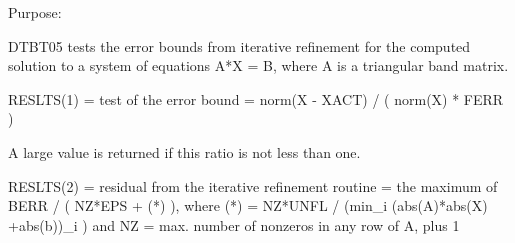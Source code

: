 \begin{DoxyParagraph}{Purpose\+: }
\begin{DoxyVerb} DTBT05 tests the error bounds from iterative refinement for the
 computed solution to a system of equations A*X = B, where A is a
 triangular band matrix.

 RESLTS(1) = test of the error bound
           = norm(X - XACT) / ( norm(X) * FERR )

 A large value is returned if this ratio is not less than one.

 RESLTS(2) = residual from the iterative refinement routine
           = the maximum of BERR / ( NZ*EPS + (*) ), where
             (*) = NZ*UNFL / (min_i (abs(A)*abs(X) +abs(b))_i )
             and NZ = max. number of nonzeros in any row of A, plus 1\end{DoxyVerb}
 
\end{DoxyParagraph}


